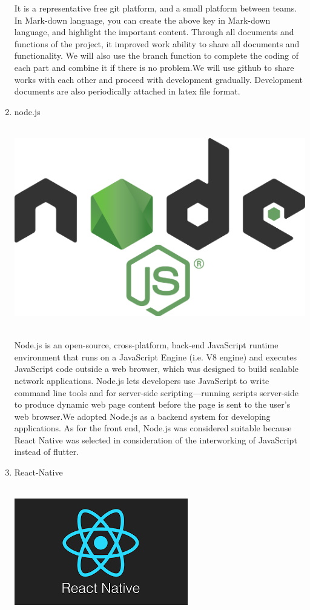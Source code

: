 \documentclass[conference]{IEEEtran}
\begin{document}
\begin{enumerate}
It is a representative free git platform, and a small platform between teams. In Mark-down language, you can create the above key in Mark-down language, and highlight the important content. Through all documents and functions of the project, it improved work ability to share all documents and functionality. We will also use the branch function to complete the coding of each part and combine it if there is no problem.We will use github to share works with each other and proceed with development gradually. Development documents are also periodically attached in latex file format.\\
	\item{node.js}\\
	\\
	\centerline{\includegraphics[scale=0.13]{pics/nodejs.png}}\\
Node.js is an open-source, cross-platform, back-end JavaScript runtime environment that runs on a JavaScript Engine (i.e. V8 engine) and executes JavaScript code outside a web browser, which was designed to build scalable network applications. Node.js lets developers use JavaScript to write command line tools and for server-side scripting—running scripts server-side to produce dynamic web page content before the page is sent to the user's web browser.We adopted Node.js as a backend system for developing applications. As for the front end, Node.js was considered suitable because React Native was selected in consideration of the interworking of JavaScript instead of flutter.\\
	\item{React-Native}\\
	\\
	\centerline{\includegraphics[scale=0.4]{pics/React-Native.png}}\\

\end{enumerate}
\end{document}
